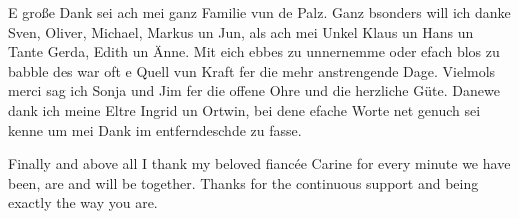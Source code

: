 
E große Dank sei ach
mei ganz Familie vun de Palz.
Ganz bsonders will ich danke Sven, Oliver,
Michael, Markus un Jun,
als ach mei Unkel Klaus un Hans
un Tante Gerda, Edith un Änne.
Mit eich ebbes zu unnernemme oder efach blos zu babble
des war oft e Quell vun Kraft fer die mehr anstrengende Dage.
Vielmols merci sag ich Sonja und Jim
fer die offene Ohre und die herzliche Güte.
Danewe dank ich meine Eltre Ingrid un Ortwin,
bei dene efache Worte net genuch sei kenne
um mei Dank im entferndeschde zu fasse.


Finally and above all I thank my beloved fianc\'ee Carine
for every minute we have been, are and will be together.
Thanks for the continuous support and being exactly the way you are.
